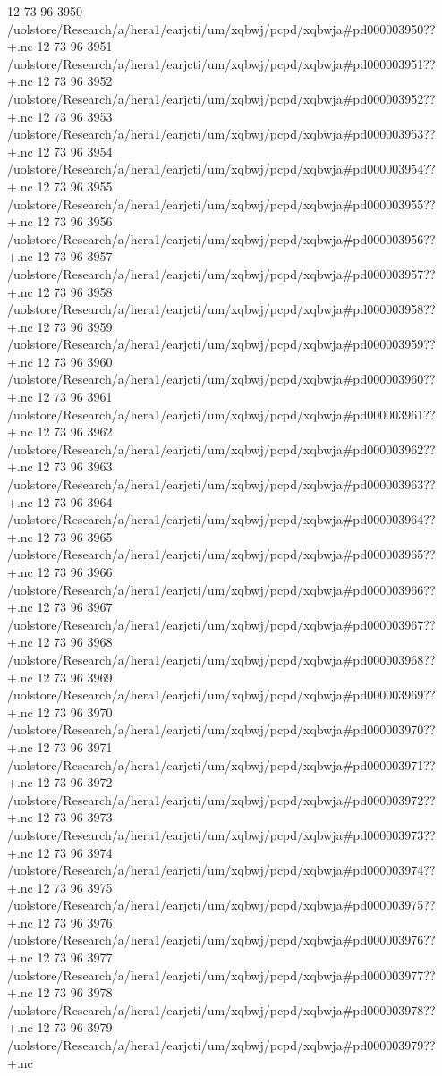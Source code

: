 12 73 96
3950
/uolstore/Research/a/hera1/earjcti/um/xqbwj/pcpd/xqbwja#pd000003950??+.nc
12 73 96
3951
/uolstore/Research/a/hera1/earjcti/um/xqbwj/pcpd/xqbwja#pd000003951??+.nc
12 73 96
3952
/uolstore/Research/a/hera1/earjcti/um/xqbwj/pcpd/xqbwja#pd000003952??+.nc
12 73 96
3953
/uolstore/Research/a/hera1/earjcti/um/xqbwj/pcpd/xqbwja#pd000003953??+.nc
12 73 96
3954
/uolstore/Research/a/hera1/earjcti/um/xqbwj/pcpd/xqbwja#pd000003954??+.nc
12 73 96
3955
/uolstore/Research/a/hera1/earjcti/um/xqbwj/pcpd/xqbwja#pd000003955??+.nc
12 73 96
3956
/uolstore/Research/a/hera1/earjcti/um/xqbwj/pcpd/xqbwja#pd000003956??+.nc
12 73 96
3957
/uolstore/Research/a/hera1/earjcti/um/xqbwj/pcpd/xqbwja#pd000003957??+.nc
12 73 96
3958
/uolstore/Research/a/hera1/earjcti/um/xqbwj/pcpd/xqbwja#pd000003958??+.nc
12 73 96
3959
/uolstore/Research/a/hera1/earjcti/um/xqbwj/pcpd/xqbwja#pd000003959??+.nc
12 73 96
3960
/uolstore/Research/a/hera1/earjcti/um/xqbwj/pcpd/xqbwja#pd000003960??+.nc
12 73 96
3961
/uolstore/Research/a/hera1/earjcti/um/xqbwj/pcpd/xqbwja#pd000003961??+.nc
12 73 96
3962
/uolstore/Research/a/hera1/earjcti/um/xqbwj/pcpd/xqbwja#pd000003962??+.nc
12 73 96
3963
/uolstore/Research/a/hera1/earjcti/um/xqbwj/pcpd/xqbwja#pd000003963??+.nc
12 73 96
3964
/uolstore/Research/a/hera1/earjcti/um/xqbwj/pcpd/xqbwja#pd000003964??+.nc
12 73 96
3965
/uolstore/Research/a/hera1/earjcti/um/xqbwj/pcpd/xqbwja#pd000003965??+.nc
12 73 96
3966
/uolstore/Research/a/hera1/earjcti/um/xqbwj/pcpd/xqbwja#pd000003966??+.nc
12 73 96
3967
/uolstore/Research/a/hera1/earjcti/um/xqbwj/pcpd/xqbwja#pd000003967??+.nc
12 73 96
3968
/uolstore/Research/a/hera1/earjcti/um/xqbwj/pcpd/xqbwja#pd000003968??+.nc
12 73 96
3969
/uolstore/Research/a/hera1/earjcti/um/xqbwj/pcpd/xqbwja#pd000003969??+.nc
12 73 96
3970
/uolstore/Research/a/hera1/earjcti/um/xqbwj/pcpd/xqbwja#pd000003970??+.nc
12 73 96
3971
/uolstore/Research/a/hera1/earjcti/um/xqbwj/pcpd/xqbwja#pd000003971??+.nc
12 73 96
3972
/uolstore/Research/a/hera1/earjcti/um/xqbwj/pcpd/xqbwja#pd000003972??+.nc
12 73 96
3973
/uolstore/Research/a/hera1/earjcti/um/xqbwj/pcpd/xqbwja#pd000003973??+.nc
12 73 96
3974
/uolstore/Research/a/hera1/earjcti/um/xqbwj/pcpd/xqbwja#pd000003974??+.nc
12 73 96
3975
/uolstore/Research/a/hera1/earjcti/um/xqbwj/pcpd/xqbwja#pd000003975??+.nc
12 73 96
3976
/uolstore/Research/a/hera1/earjcti/um/xqbwj/pcpd/xqbwja#pd000003976??+.nc
12 73 96
3977
/uolstore/Research/a/hera1/earjcti/um/xqbwj/pcpd/xqbwja#pd000003977??+.nc
12 73 96
3978
/uolstore/Research/a/hera1/earjcti/um/xqbwj/pcpd/xqbwja#pd000003978??+.nc
12 73 96
3979
/uolstore/Research/a/hera1/earjcti/um/xqbwj/pcpd/xqbwja#pd000003979??+.nc
